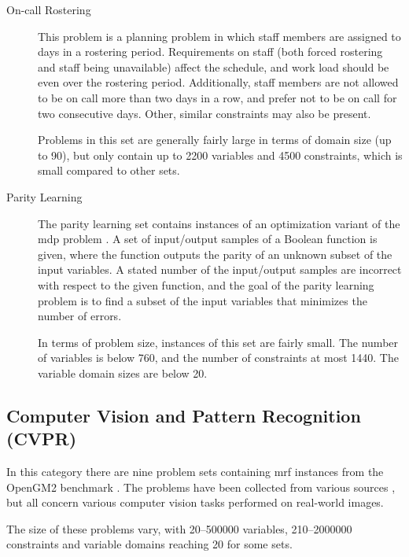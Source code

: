 \begin{description}
	\item[On-call Rostering]
		This problem is a planning problem in which staff members are assigned to days in a rostering period.
		Requirements on staff (both forced rostering and staff being unavailable) affect the schedule, and work load should be even over the rostering period.
		Additionally, staff members are not allowed to be on call more than two days in a row, and prefer not to be on call for two consecutive days.
		Other, similar constraints may also be present.

		Problems in this set are generally fairly large in terms of domain size (up to \num{90}), but only contain up to \num{2200} variables and \num{4500} constraints, which is small compared to other sets.

	\item[Parity Learning]
		The parity learning set contains instances of an optimization variant of the \gls{mdp} problem \parencite{Crawford94}.
		A set of input/output samples of a Boolean function is given, where the function outputs the parity of an unknown subset of the input variables.
		A stated number of the input/output samples are incorrect with respect to the given function, and the goal of the parity learning problem is to find a subset of the input variables that minimizes the number of errors.

		In terms of problem size, instances of this set are fairly small. The number of variables is below \num{760}, and the number of constraints at most \num{1440}. The variable domain sizes are below \num{20}.
\end{description}

\subsection{Computer Vision and Pattern Recognition (CVPR)}
In this category there are nine problem sets containing \gls{mrf} instances from the OpenGM2 benchmark \parencite{Kappes13}.
The problems have been collected from various sources \parencite[\pno~1330]{Kappes13}, but all concern various computer vision tasks performed on real-world images.

The size of these problems vary, with \numrange{20}{500000} variables, \numrange{210}{2000000} constraints and variable domains reaching \num{20} for some sets.

